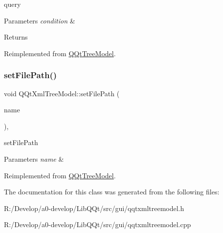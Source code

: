 query 


\begin{DoxyParams}{Parameters}
{\em condition} & \\
\hline
\end{DoxyParams}
\begin{DoxyReturn}{Returns}

\end{DoxyReturn}


Reimplemented from \mbox{\hyperlink{class_q_qt_tree_model_aacd492ce920be939d95d7e1bc2978cb1}{Q\+Qt\+Tree\+Model}}.

\mbox{\label{class_q_qt_xml_tree_model_a66f2bb18d1af1ce2df8f22cad0bc5120}} 
\subsubsection{\texorpdfstring{set\+File\+Path()}{setFilePath()}}
{\footnotesize\ttfamily void Q\+Qt\+Xml\+Tree\+Model\+::set\+File\+Path (\begin{DoxyParamCaption}\item[{Q\+String}]{name }\end{DoxyParamCaption})\hspace{0.3cm}{\ttfamily [override]}, {\ttfamily [virtual]}}



set\+File\+Path 


\begin{DoxyParams}{Parameters}
{\em name} & \\
\hline
\end{DoxyParams}


Reimplemented from \mbox{\hyperlink{class_q_qt_tree_model_acfeea0d58fa29b1c34c1491f6a8f0b7c}{Q\+Qt\+Tree\+Model}}.



The documentation for this class was generated from the following files\+:\begin{DoxyCompactItemize}
\item 
R\+:/\+Develop/a0-\/develop/\+Lib\+Q\+Qt/src/gui/qqtxmltreemodel.\+h\item 
R\+:/\+Develop/a0-\/develop/\+Lib\+Q\+Qt/src/gui/qqtxmltreemodel.\+cpp\end{DoxyCompactItemize}
